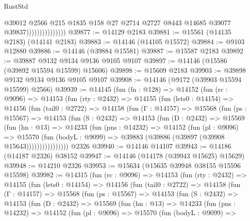 \begin{lexlean}{RustStd}
\begin{coremodule}
                                  @39012
                                  @2566
                                  @215
                                  @1835
                                  @158
                                  @27
                                  @2714
                                  @2727
                                  @8443
                                  @14685
                                  @39077
                                  @39837)))))))))))))))
@39877 := @14129 @2183
@39881 := @15561 (@14135 @2183) (@14141 @2183)
@39883 := @14146 (@14105 @15572)
@39884 := @9103 @12880
@39886 := @14146 (@39884 @15581)
@39887 := @15587 @2183
@39892 := @39887 @9132 @9134 @9136 @9105 @9107
@39897 := @14146 (@15586 (@39892 @15594 @15599) @15606)
@39898 := @15609 @2183
@39903 := @39898 @9132 @9134 @9136 @9105 @9107
@39908 := @14146 (@9172 (@39903 @15594 @15599) @2566)
@39939 := @14145
    (fun (fn : @128) =>
    @14152
      (fun (rc : @9096) =>
      @14153
        (fun (rty : @2432) =>
        @14155
          (fun (lets0 : @14154) =>
          @14156
            (fun (tail0 : @2722) =>
            @14158
              (fun (Γ : @14157) =>
              @15568
                (fun (ps : @15567) =>
                @14153
                  (fun (S : @2432) =>
                  @14153
                    (fun (D : @2432) =>
                    @15569
                      (fun (hn : @13) =>
                      @14233
                        (fun (pns : @14232) =>
                        @14152
                          (fun (pl : @9096) =>
                          @15570
                            (fun (bodyL : @9099) =>
                            @39883 (@39886 (@39897 (@39908 @15643))))))))))))))))
    @2326
@39940 := @14146 @14107
@39943 := @14186 (@14187 @2326) @38152
@39947 := @14146 (@14178 (@39943 @15625) @15629)
@39948 := @14210 @2326
@39953 := @15634 (@15635 @39948 @38155 @15596 @15598)
@39982 := @14315
    (fun (rc : @9096) =>
    @14153
      (fun (rty : @2432) =>
      @14155
        (fun (lets0 : @14154) =>
        @14156
          (fun (tail0 : @2722) =>
          @14158
            (fun (Γ : @14157) =>
            @15568
              (fun (ps : @15567) =>
              @14153
                (fun (S : @2432) =>
                @14153
                  (fun (D : @2432) =>
                  @15569
                    (fun (hn : @13) =>
                    @14233
                      (fun (pns : @14232) =>
                      @14152
                        (fun (pl : @9096) =>
                        @15570
                          (fun (bodyL : @9099) =>

\end{coremodule}
\end{lexlean}
